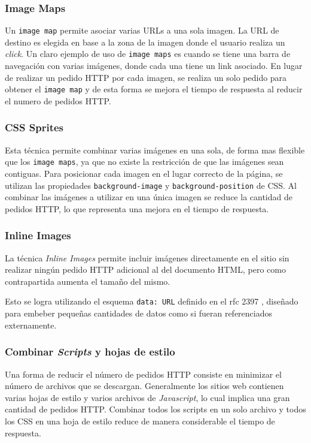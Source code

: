 \documentclass[a4paper,12pt]{report}
\begin{document}
\subsubsection{Image Maps}

Un \texttt{image map} permite asociar varias URLs a una sola imagen. La URL de destino es elegida en base a la zona de la imagen donde el usuario realiza un \emph{click}.
Un claro ejemplo de uso de \texttt{image maps} es cuando se tiene una barra de navegación con varias imágenes, donde cada una tiene un link asociado.
En lugar de realizar un pedido HTTP por cada imagen, se realiza un solo pedido para obtener el \texttt{image map} y de esta forma se mejora el tiempo de respuesta
al reducir el numero de pedidos HTTP.

\subsubsection{CSS Sprites}

Esta técnica permite combinar varias imágenes en una sola, de forma mas flexible que los \texttt{image maps}, ya que no existe la restricción de que las imágenes
sean contiguas. Para posicionar cada imagen en el lugar correcto de la página, se utilizan las propiedades \texttt{background-image} y
\texttt{background-position} de CSS.
Al combinar las imágenes a utilizar en una única imagen se reduce la cantidad de pedidos HTTP, lo que representa una mejora en el tiempo de respuesta.

\subsubsection{Inline Images}

La técnica \emph{Inline Images} permite incluir imágenes directamente en el sitio sin realizar ningún pedido HTTP adicional al del documento HTML, pero como contrapartida
aumenta el tamaño del mismo.

Esto se logra utilizando el esquema \texttt{data: URL} definido en el rfc 2397 \cite{rfc2397}, diseñado para embeber pequeñas cantidades de datos como 
si fueran referenciados externamente.

\subsubsection{Combinar \emph{Scripts} y hojas de estilo}

Una forma de reducir el número de pedidos HTTP consiste en minimizar el número de archivos que se descargan. Generalmente los sitios web contienen
varias hojas de estilo y varios archivos de \emph{Javascript}, lo cual implica una gran cantidad de pedidos HTTP. Combinar todos los scripts en un solo archivo y
todos los CSS en una hoja de estilo reduce de manera considerable el tiempo de respuesta.
\end{document}
